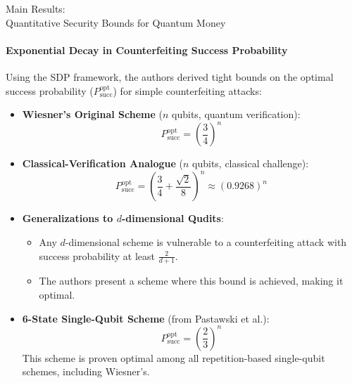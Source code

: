 \documentclass{beamer}
\begin{document}
\begin{frame}{Main Results: \\Quantitative Security Bounds for Quantum Money}
    \framesubtitle{Exponential Decay in Counterfeiting Success Probability}
    Using the SDP framework, the authors derived tight bounds on the optimal success probability ($P_{\text{succ}}^{\text{opt}}$) for simple counterfeiting attacks:
    \pause
    \begin{itemize}
        \item \textbf{Wiesner's Original Scheme} ($n$ qubits, quantum verification):
        $$ P_{\text{succ}}^{\text{opt}} = \left(\frac{3}{4}\right)^n $$
        \pause
        \item \textbf{Classical-Verification Analogue} ($n$ qubits, classical challenge):
        $$ P_{\text{succ}}^{\text{opt}} = \left(\frac{3}{4} + \frac{\sqrt{2}}{8}\right)^n \approx (0.9268)^n $$
        \pause
        \item \textbf{Generalizations to $d$-dimensional Qudits}:
        \begin{itemize}
            \item Any $d$-dimensional scheme is vulnerable to a counterfeiting attack with success probability at least $\frac{2}{d+1}$.
            \item The authors present a scheme where this bound is achieved, making it optimal.
        \end{itemize}
        \pause
        \item \textbf{6-State Single-Qubit Scheme} (from Pastawski et al.):
        $$ P_{\text{succ}}^{\text{opt}} = \left(\frac{2}{3}\right)^n $$
        This scheme is proven optimal among all repetition-based single-qubit schemes, including Wiesner's.
    \end{itemize}
\end{frame}
\end{document}
